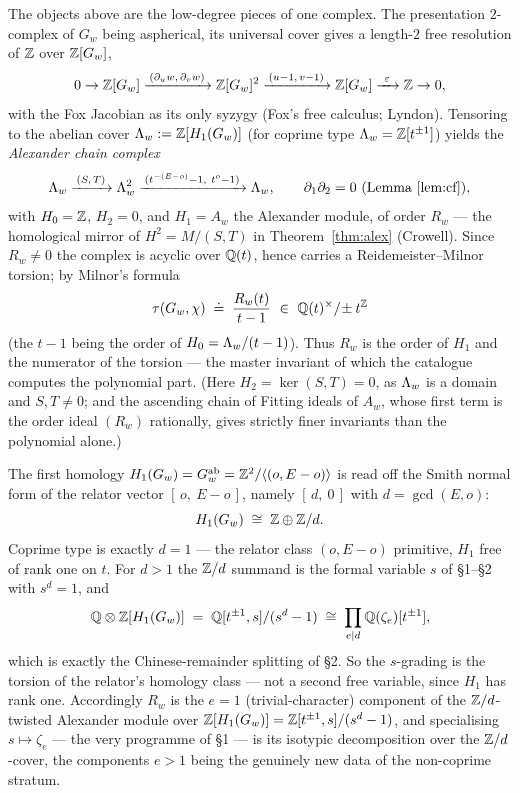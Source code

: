 \begin{rem}\label{rem:torsion}
The objects above are the low-degree pieces of one complex. The presentation $2$-complex of
$G_w$ being aspherical, its universal cover gives a length-$2$ free resolution of $\mathbb{Z}$ over
$\mathbb{Z}[G_w]$,
\[
   0\to \Z[G_w]\xrightarrow{\,(\partial_u w,\,\partial_v w)\,}\Z[G_w]^2
        \xrightarrow{\,(u-1,\,v-1)\,}\Z[G_w]\xrightarrow{\ \varepsilon\ }\Z\to0,
\]
with the Fox Jacobian as its only syzygy (Fox's free calculus; Lyndon). Tensoring to the abelian
cover $\Lambda_w:=\mathbb{Z}[H_1(G_w)]$ (for coprime type $\Lambda_w=\mathbb{Z}[t^{\pm1}]$) yields the \emph{Alexander
chain complex}
\[
   \Lambda_w\xrightarrow{\,(S,\,T)\,}\Lambda_w^2
         \xrightarrow{\,(t^{-(E-o)}-1,\ t^{o}-1)\,}\Lambda_w,\qquad
   \partial_1\partial_2=0\ \text{(Lemma~\ref{lem:cf})},
\]
with $H_0=\mathbb{Z}$, $H_2=0$, and $H_1=A_w$ the Alexander module, of order $R_w$ --- the homological
mirror of $H^2=M/(S,T)$ in Theorem~\ref{thm:alex} (Crowell). Since $R_w\ne0$ the complex is
acyclic over $\mathbb{Q}(t)$, hence carries a Reidemeister--Milnor torsion; by Milnor's formula
\[
   \tau(G_w,\chi)\;\doteq\;\frac{R_w(t)}{t-1}\ \in\ \Q(t)^\times/\!\pm t^{\Z}
\]
(the $t-1$ being the order of $H_0=\Lambda_w/(t-1)$). Thus $R_w$ is the order of $H_1$ and the
numerator of the torsion --- the master invariant of which the catalogue computes the polynomial
part. (Here $H_2=\ker(S,T)=0$, as $\Lambda_w$ is a domain and $S,T\ne0$; and the ascending chain
of Fitting ideals of $A_w$, whose first term is the order ideal $(R_w)$ rationally, gives
strictly finer invariants than the polynomial alone.)
\end{rem}

\begin{rem}\label{rem:noncoprime}
The first homology $H_1(G_w)=G_w^{\mathrm{ab}}=\mathbb{Z}^2/\langle(o,E-o)\rangle$ is read off the Smith
normal form of the relator vector $[\,o,\ E-o\,]$, namely $[\,d,\ 0\,]$ with $d=\gcd(E,o)$:
\[
   H_1(G_w)\;\cong\;\mathbb{Z}\oplus\mathbb{Z}/d .
\]
Coprime type is exactly $d=1$ --- the relator class $(o,E-o)$ primitive, $H_1$ free of rank one
on $t$. For $d>1$ the $\mathbb{Z}/d$ summand is the formal variable $s$ of \S1--\S2 with $s^{d}=1$, and
\[
   \mathbb{Q}\otimes\mathbb{Z}[H_1(G_w)]\;=\;\mathbb{Q}[t^{\pm1},s]/(s^{d}-1)\;\cong\;\prod_{e\mid d}\mathbb{Q}(\zeta_e)[t^{\pm1}],
\]
which is exactly the Chinese-remainder splitting of \S2. So the $s$-grading is the torsion of the
relator's homology class --- not a second free variable, since $H_1$ has rank one. Accordingly
$R_w$ is the $e=1$ (trivial-character) component of the $\mathbb{Z}/d$-twisted Alexander module over
$\mathbb{Z}[H_1(G_w)]=\mathbb{Z}[t^{\pm1},s]/(s^{d}-1)$, and specialising $s\mapsto\zeta_e$ --- the very programme
of \S1 --- is its isotypic decomposition over the $\mathbb{Z}/d$-cover, the components $e>1$ being the
genuinely new data of the non-coprime stratum.
\end{rem}

